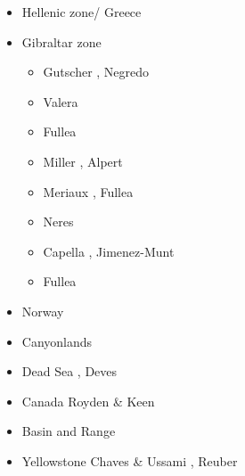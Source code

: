 \begin{itemize}
\item Hellenic zone/ Greece  
{\scriptsize
\cite{spwv88}
\cite{guhf13}
\cite{olpr14}
}
\item Gibraltar zone 
\begin{scriptsize}
\begin{itemize}
\item[\twothousandtwo] Gutscher \etal \cite{gumr02}, Negredo \etal \cite{nebs02}
\item[\twothousandeight] Valera \etal \cite{vanv08}
\item[\twothousandten] Fullea \etal \cite{fufa10}
\item[\twothousandthirteen] Miller \etal \cite{miab13}, Alpert \etal \cite{almb13}
\item[\twothousandfifteen] Meriaux \etal \cite{medd15}, Fullea \etal \cite{furc15}
\item[\twothousandsixteen] Neres \etal \cite{necf16}
\item[\twothousandnineteen] Capella \etal \cite{casv19}, Jimenez-Munt \etal \cite{jitf19}
\item[\twothousandtwentyone] Fullea \etal \cite{func21}
\end{itemize}
\end{scriptsize}
\item Norway 
{\scriptsize
\cite{soma13}
\cite{bubj15}
}
\item Canyonlands 
{\scriptsize
\cite{trca94}
\cite{scwa02}
\cite{grsk03}
}
\item Dead Sea 
{\scriptsize
\cite{sopg05},
Deves \etal \cite{dekk11}
}
\item Canada 
{\scriptsize
Royden \& Keen \cite{roke80}
\cite{brbw93}
\cite{pelj99}
}
\item Basin and Range 
{\scriptsize
\cite{brbe89c}
\cite{wefr09}
}
\item Yellowstone 
{\scriptsize
Chaves \& Ussami \cite{chus13},
Reuber \etal \cite{rekp18}
}


\end{itemize}
